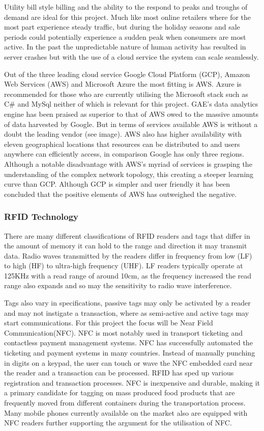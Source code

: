 \documentclass[a4paper, 11pt]{article}
\begin{document}
Utility bill style billing and the ability to the respond to peaks and troughs of demand are ideal for this project. Much like most online retailers where for the most part experience steady traffic, but during the holiday seasons and sale periods could potentially experience a sudden peak when consumers are most active. In the past the unpredictable nature of human activity has resulted in server crashes but with the use of a cloud service the system can scale seamlessly.

Out of the three leading cloud service Google Cloud Platform (GCP), Amazon Web Services (AWS) and Microsoft Azure the most fitting is AWS. Azure is recommended for those who are currently utilising the Microsoft stack such as C\# and MySql neither of which is relevant for this project. GAE's data analytics engine has been praised as superior to that of AWS owed to the massive amounts of data harvested by Google.\cite{cays} \cite{HadoopInAction} But in terms of services available AWS is without a doubt the leading vendor (see image).  AWS also has higher availability with eleven geographical locations that resources can be distributed to and users anywhere can efficiently access, in comparison Google has only three regions. Although a notable disadvantage with AWS's myriad of services is grasping the understanding of the complex network topology, this creating a steeper learning curve than GCP. Although GCP is simpler and user friendly it has been concluded that the positive elements of AWS has outweighed the negative.

\subsubsection{RFID Technology}
There are many different classifications of RFID readers and tags that differ in the amount of memory it can hold to the range and direction it may transmit data. Radio waves transmitted by the readers differ in frequency from low (LF) to high (HF) to ultra-high frequency (UHF). LF readers typically operate at 125KHz with a read range of around 10cm, as the frequency increased the read range also expands and so may the sensitivity to radio wave interference.

Tags also vary in specifications, passive tags may only be activated by a reader and may not instigate a transaction, where as semi-active and active tags may start communications. For this project the focus will be Near Field Communication(NFC). NFC is most notably used in transport ticketing and contactless payment management systems. NFC has successfully automated the ticketing and payment systems in many countries. Instead of manually punching in digits on a keypad, the user can touch or wave the NFC embedded card near the reader and a transaction can be processed. RFID has sped up various registration and transaction processes. NFC is inexpensive and durable, making it a primary candidate for tagging on mass produced food products that are frequently moved from different containers during the transportation process. Many mobile phones currently available on the market also are equipped with NFC readers further supporting the argument for the utilisation of NFC.
\end{document}
